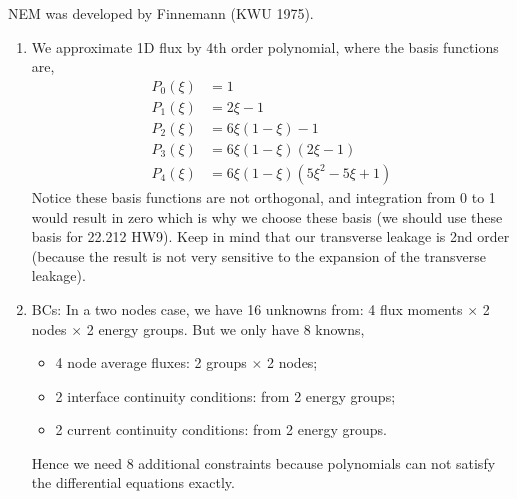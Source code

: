 \documentclass{school-22.211-notes}
\begin{document}
\clearpage
{}
NEM was developed by Finnemann (KWU 1975). 
  \begin{enumerate}
  \item We approximate 1D flux by 4th order polynomial, 
    where the basis functions are, 
    \begin{align}
      P_0(\xi) &= 1 \\
      P_1(\xi) &= 2 \xi - 1\\
      P_2(\xi) &= 6 \xi (1-\xi) - 1 \\
      P_3(\xi) &= 6 \xi (1-\xi)(2\xi-1) \\
      P_4(\xi) &= 6 \xi (1-\xi)(5\xi^2 -5\xi +1)
    \end{align}
    Notice these basis functions are not orthogonal, and integration from 0 to 1 would result in zero which is why we choose these basis (we should use these basis for 22.212 HW9). Keep in mind that our transverse leakage is 2nd order (because the result is not very sensitive to the expansion of the transverse leakage). 

  \item BCs: In a two nodes case, we have 16 unknowns from: 4 flux moments $\times$ 2 nodes $\times$ 2 energy groups. But we only have 8 knowns, 
    \begin{itemize}
      \item 4 node average fluxes: 2 groups $\times$ 2 nodes;
      \item 2 interface continuity conditions: from 2 energy groups;
      \item 2 current continuity conditions: from 2 energy groups. 
    \end{itemize}
    Hence we need 8 additional constraints because polynomials can not satisfy the differential equations exactly. 


\end{enumerate}
\end{document}

